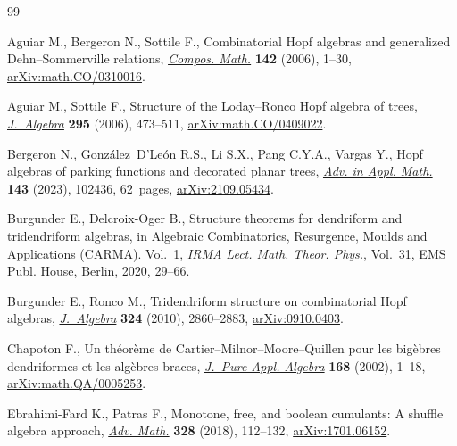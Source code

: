 \documentclass[10pt,a4paper]{amsart}
\numberwithin{equation}{section}
\theoremstyle{definition}
\theoremstyle{plain}
\begin{document}

\begin{thebibliography}{99}
\footnotesize\itemsep=0pt

Aguiar M., Bergeron N., Sottile F., Combinatorial {H}opf algebras and
 generalized {D}ehn--{S}ommerville relations, \href{https://doi.org/10.1112/S0010437X0500165X}{\textit{Compos. Math.}}
 \textbf{142} (2006), 1--30, \href{https://arxiv.org/abs/math.CO/0310016}{arXiv:math.CO/0310016}.

Aguiar M., Sottile F., Structure of the {L}oday--{R}onco {H}opf algebra of
 trees, \href{https://doi.org/10.1016/j.jalgebra.2005.06.021}{\textit{J.~Algebra}} \textbf{295} (2006), 473--511,
 \href{https://arxiv.org/abs/math.CO/0409022}{arXiv:math.CO/0409022}.

Bergeron N., Gonz\'alez~D'Le\'on R.S., Li S.X., Pang C.Y.A., Vargas Y., Hopf
 algebras of parking functions and decorated planar trees, \href{https://doi.org/10.1016/j.aam.2022.102436}{\textit{Adv. in
 Appl. Math.}} \textbf{143} (2023), 102436, 62~pages, \href{https://arxiv.org/abs/2109.05434}{arXiv:2109.05434}.

Burgunder E., Delcroix-Oger B., Structure theorems for dendriform and
 tridendriform algebras, in Algebraic {C}ombinatorics, {R}esurgence, {M}oulds
 and {A}pplications ({CARMA}). {V}ol.~1, \textit{IRMA Lect. Math. Theor.
 Phys.}, Vol.~31, \href{https://doi.org/10.4171/204-1/2}{EMS Publ. House}, Berlin, 2020, 29--66.

Burgunder E., Ronco M., Tridendriform structure on combinatorial {H}opf
 algebras, \href{https://doi.org/10.1016/j.jalgebra.2010.07.010}{\textit{J.~Algebra}} \textbf{324} (2010), 2860--2883,
 \href{https://arxiv.org/abs/0910.0403}{arXiv:0910.0403}.

Chapoton F., Un th\'eor\`eme de {C}artier--{M}ilnor--{M}oore--{Q}uillen pour
 les big\`ebres dendriformes et les alg\`ebres braces, \href{https://doi.org/10.1016/S0022-4049(01)00052-4}{\textit{J.~Pure Appl.
 Algebra}} \textbf{168} (2002), 1--18, \href{https://arxiv.org/abs/math.QA/0005253}{arXiv:math.QA/0005253}.

Ebrahimi-Fard K., Patras F., Monotone, free, and boolean cumulants: {A} shuffle
 algebra approach, \href{https://doi.org/10.1016/j.aim.2018.01.003}{\textit{Adv. Math.}} \textbf{328} (2018), 112--132,
 \href{https://arxiv.org/abs/1701.06152}{arXiv:1701.06152}.


\end{thebibliography}
\end{document}

